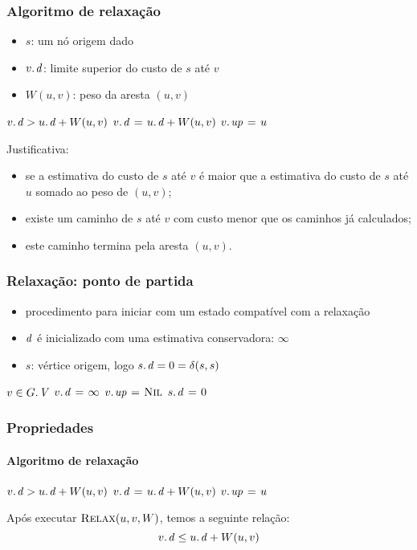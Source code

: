 \documentclass{beamer}
\begin{document}
\begin{frame}
\frametitle{Algoritmo de relaxação}

\begin{itemize}
\item $s$: um nó origem dado
\item $\attrib{v}{d}$: limite superior do custo de $s$ até $v$
\item $W(u, v)$: peso da aresta $(u, v)$
\end{itemize}
\begin{codebox}
\li \If $\attrib{v}{d} > \attrib{u}{d} + W(u, v)$
\li \Then $\attrib{v}{d} \gets \attrib{u}{d} + W(u, v)$
\li   $\attrib{v}{up} \gets u$
    \End
\end{codebox}
\pause
Justificativa:
\begin{itemize}
\item se a estimativa do custo de $s$ até $v$ é maior que a estimativa
  do custo de $s$ até $u$ somado ao peso de $(u, v)$;
\item existe um caminho de $s$ até $v$ com custo menor que os caminhos
  já calculados;
\item este caminho termina pela aresta $(u, v)$.
\end{itemize}
\end{frame}

\begin{frame}
\frametitle{Relaxação: ponto de partida}

\begin{itemize}
\item procedimento para iniciar com um estado compatível com a relaxação
\item $\id{d}$ é inicializado com uma estimativa conservadora: $\infty$
\item $s$: vértice origem, logo $\attrib{s}{d} = 0 = \delta(s, s)$
\end{itemize}

\begin{codebox}
\li \For $v \in \attrib{G}{V}$
\li \Do $\attrib{v}{d} \gets \infty$
\li   $\attrib{v}{up} \gets \const{Nil}$
    \End
\li $\attrib{s}{d} \gets 0$
\end{codebox}

\end{frame}

\begin{frame}
\frametitle{Propriedades}
\framesubtitle{Algoritmo de relaxação}

\begin{codebox}
\li \If $\attrib{v}{d} > \attrib{u}{d} + W(u, v)$
\li \Then $\attrib{v}{d} \gets \attrib{u}{d} + W(u, v)$
\li   $\attrib{v}{up} \gets u$
    \End
\end{codebox}

\begin{lemma}
Após executar $\textnormal{\scshape Relax}(u, v, W)$, temos a seguinte relação:
$$
\attrib{v}{d} \le \attrib{u}{d} + W(u, v)
$$
\end{lemma}

\end{frame}
\end{document}
